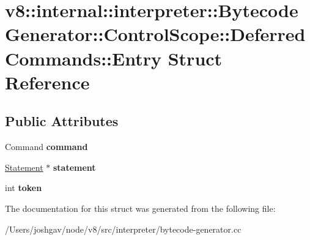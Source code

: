 \hypertarget{structv8_1_1internal_1_1interpreter_1_1_bytecode_generator_1_1_control_scope_1_1_deferred_commands_1_1_entry}{}\section{v8\+:\+:internal\+:\+:interpreter\+:\+:Bytecode\+Generator\+:\+:Control\+Scope\+:\+:Deferred\+Commands\+:\+:Entry Struct Reference}
\label{structv8_1_1internal_1_1interpreter_1_1_bytecode_generator_1_1_control_scope_1_1_deferred_commands_1_1_entry}
\subsection*{Public Attributes}
\begin{DoxyCompactItemize}
\item 
Command {\bfseries command}\hypertarget{structv8_1_1internal_1_1interpreter_1_1_bytecode_generator_1_1_control_scope_1_1_deferred_commands_1_1_entry_a38c78fbe1ff0c4ef6bdd18288a5cb462}{}\label{structv8_1_1internal_1_1interpreter_1_1_bytecode_generator_1_1_control_scope_1_1_deferred_commands_1_1_entry_a38c78fbe1ff0c4ef6bdd18288a5cb462}

\item 
\hyperlink{classv8_1_1internal_1_1_statement}{Statement} $\ast$ {\bfseries statement}\hypertarget{structv8_1_1internal_1_1interpreter_1_1_bytecode_generator_1_1_control_scope_1_1_deferred_commands_1_1_entry_af10ad8734b5e1015f556ee34c1856dcc}{}\label{structv8_1_1internal_1_1interpreter_1_1_bytecode_generator_1_1_control_scope_1_1_deferred_commands_1_1_entry_af10ad8734b5e1015f556ee34c1856dcc}

\item 
int {\bfseries token}\hypertarget{structv8_1_1internal_1_1interpreter_1_1_bytecode_generator_1_1_control_scope_1_1_deferred_commands_1_1_entry_a74e9d5204bec09eeca97b53992cd0698}{}\label{structv8_1_1internal_1_1interpreter_1_1_bytecode_generator_1_1_control_scope_1_1_deferred_commands_1_1_entry_a74e9d5204bec09eeca97b53992cd0698}

\end{DoxyCompactItemize}


The documentation for this struct was generated from the following file\+:\begin{DoxyCompactItemize}
\item 
/\+Users/joshgav/node/v8/src/interpreter/bytecode-\/generator.\+cc\end{DoxyCompactItemize}
